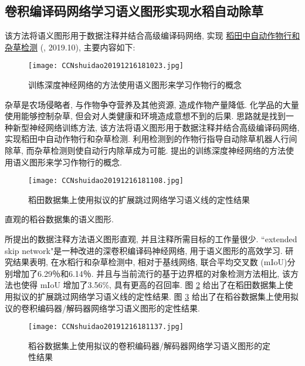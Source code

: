 \subsection{卷积编译码网络学习语义图形实现水稻自动除草}
该方法将语义图形用于数据注释并结合高级编译码网络, 实现 \href{https://doi.org/10.3389/fpls.2019.01404}{稻田中自动作物行和杂草检测} (\cite{Adhikari-2019}, 2019.10), 主要内容如下:
\begin{figure}[H]
    \centering
    \texttt{[image: CCNshuidao20191216181023.jpg]}
    \caption{训练深度神经网络的方法使用语义图形来学习作物行的概念}
    \label{CCNshuidao20191216181023}
    \vspace{-0.4cm}
\end{figure}
杂草是农场侵略者, 与作物争夺营养及其他资源, 造成作物产量降低.
化学品的大量使用能够控制杂草, 但会对人类健康和环境造成意想不到的后果.
思路就是找到一种新型神经网络训练方法, 该方法将语义图形用于数据注释并结合高级编译码网络, 实现稻田中自动作物行和杂草检测.
利用检测到的作物行指导自动除草机器人行间除草, 而杂草检测则使自动行内除草成为可能. 提出的训练深度神经网络的方法使用语义图形来学习作物行的概念.
\begin{figure}[H]
    \centering
    \texttt{[image: CCNshuidao20191216181108.jpg]}
    \caption{稻田数据集上使用拟议的扩展跳过网络学习语义线的定性结果}
    \label{CCNshuidao20191216181108}
    \vspace{-0.4cm}
\end{figure}

直观的稻谷数据集的语义图形.

所提出的数据注释方法语义图形直观, 并且注释所需目标的工作量很少. ``extended skip network"是一种改进的深卷积编译码神经网络, 用于语义图形的高效学习.
研究结果表明, 在水稻行和杂草检测中, 相对于基线网络, 联合平均交叉数 (mIoU)分别增加了6.29％和6.14％.
并且与当前流行的基于边界框的对象检测方法相比, 该方法也使得 mIoU 增加了3.56\%, 具有更高的召回率.
图 \ref{CCNshuidao20191216181108} 给出了在稻田数据集上使用拟议的扩展跳过网络学习语义线的定性结果.
图 \ref{CCNshuidao20191216181137} 给出了在稻谷数据集上使用拟议的卷积编码器/解码器网络学习语义图形的定性结果.
\begin{figure}[H]
    \centering
    \texttt{[image: CCNshuidao20191216181137.jpg]}
    \caption{稻谷数据集上使用拟议的卷积编码器/解码器网络学习语义图形的定性结果}
    \label{CCNshuidao20191216181137}
    \vspace{-0.4cm}
\end{figure}
